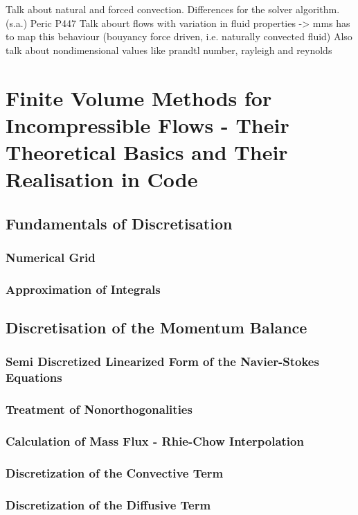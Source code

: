 \documentclass[article,type=msc,colorback,accentcolor=tud2a]{tudthesis}
\begin{document}
      Talk about natural and forced convection. Differences for the solver algorithm. (s.a.) Peric P447
      Talk abourt flows with variation in fluid properties -> mms has to map this behaviour (bouyancy force driven, i.e. naturally convected fluid)
      Also talk about nondimensional values like prandtl number, rayleigh and reynolds

  \section{Finite Volume Methods for Incompressible Flows - Their Theoretical Basics and Their Realisation in Code}

    \subsection{Fundamentals of Discretisation}
      
      \subsubsection{Numerical Grid}
      \subsubsection{Approximation of Integrals}

    \subsection{Discretisation of the Momentum Balance}
      
      \subsubsection{Semi Discretized Linearized Form of the Navier-Stokes Equations}
      \subsubsection{Treatment of Nonorthogonalities}
      \subsubsection{Calculation of Mass Flux - Rhie-Chow Interpolation}
      \subsubsection{Discretization of the Convective Term}
      \subsubsection{Discretization of the Diffusive Term}
\end{document}
